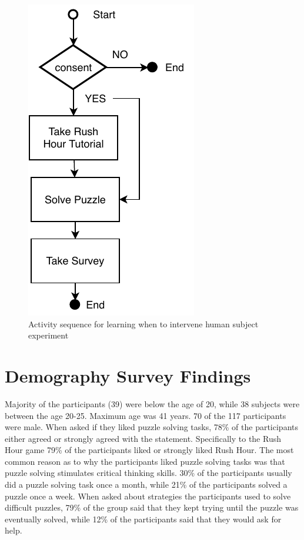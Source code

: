 \begin{figure}[tpb]
  \centering                                                    
  \includegraphics[keepaspectratio]{img/phase1.pdf}
  \caption{Activity sequence for learning when to intervene human subject experiment}
  \label{fig:phase1}
\end{figure}

\section{Demography Survey Findings}
\label{ap:demographics}
Majority of the participants (39) were below the age of 20, while 38 subjects were between the age 20-25. Maximum age was 41 years. 70 of the 117 participants were male. When asked if they liked puzzle solving tasks, 78\% of the participants either agreed or strongly agreed with the statement. Specifically to the Rush Hour game 79\% of the participants liked or strongly liked Rush Hour. The most common reason as to why the participants liked puzzle solving tasks was that puzzle solving stimulates critical thinking skills. 30\% of the participants usually did a puzzle solving task once a month, while 21\% of the participants solved a puzzle once a week. When asked about strategies the participants used to solve difficult puzzles, 79\% of the group said that they kept trying until the puzzle was eventually solved, while 12\% of the participants said that they would ask for help. 

